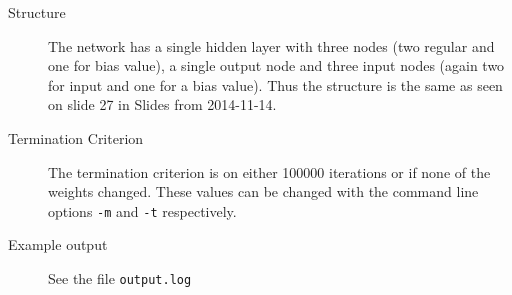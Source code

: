 \documentclass[10pt,a4paper,boxed]{hmcpset}
\begin{document}
		\begin{problem}
		\end{problem}
		\begin{solution}
			\begin{description}
				\item[Structure] The network has a single hidden layer with three nodes
					(two regular and one for bias value), a single output node and three
					input nodes (again two for input and one for a bias value). Thus the
					structure is the same as seen on slide 27 in Slides from 2014-11-14.
				\item[Termination Criterion] The termination criterion is on either
					100000 iterations or if none of the weights changed. These values can
					be changed with the command line options \verb$-m$ and \verb$-t$
					respectively.
				\item[Example output] See the file \verb$output.log$
			\end{description}
		\end{solution}
		
\end{document}
